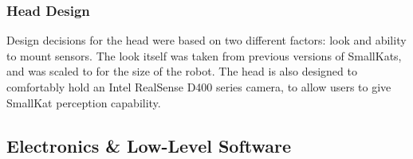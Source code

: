         \subsubsection{Head Design}
            Design decisions for the head were based on two different factors: look and ability to mount sensors. The look itself was taken from previous versions of SmallKats, and was scaled to for the size of the robot. The head is also designed to comfortably hold an Intel RealSense D400 series camera, to allow users to give SmallKat perception capability.

 
                
        
    
        



    \subsection{Electronics \& Low-Level Software}
